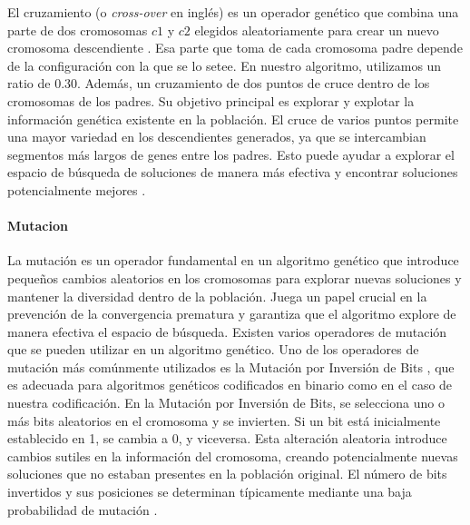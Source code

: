 El cruzamiento (o \emph{cross-over} en inglés) es un operador genético que
combina una parte de dos cromosomas $c1$ y $c2$ elegidos aleatoriamente para
crear un nuevo cromosoma descendiente . Esa parte que toma de cada cromosoma padre
depende de la configuración con la que se lo setee. En nuestro algoritmo,
utilizamos un ratio de 0.30. Además, un cruzamiento de dos puntos  de cruce dentro de los cromosomas de los padres. Su objetivo principal es explorar y explotar la información genética existente en la población.
El cruce de varios puntos permite una mayor variedad en los descendientes
generados, ya que se intercambian segmentos más largos de genes entre los
padres. Esto puede ayudar a explorar el espacio de búsqueda de soluciones de
manera más efectiva y encontrar soluciones potencialmente mejores .

\paragraph{Mutacion}

La mutación es un operador fundamental en un algoritmo genético que introduce
pequeños cambios aleatorios en los cromosomas para explorar nuevas soluciones
 y mantener la diversidad dentro de la población. Juega un
papel crucial en la prevención de la convergencia prematura 
y garantiza que el algoritmo explore de manera efectiva el espacio de búsqueda.
Existen varios operadores de mutación que se pueden utilizar en un algoritmo
genético. Uno de los operadores de mutación más comúnmente utilizados es la
Mutación por Inversión de Bits , que es adecuada para algoritmos genéticos codificados en binario como en el caso de nuestra codificación.
En la Mutación por Inversión de Bits, se selecciona uno o más bits aleatorios en
el cromosoma y se invierten. Si un bit está inicialmente establecido en 1, se
cambia a 0, y viceversa. Esta alteración aleatoria introduce cambios sutiles en
la información del cromosoma, creando potencialmente nuevas soluciones que no
estaban presentes en la población original. El número de bits invertidos y sus
posiciones se determinan típicamente mediante una baja probabilidad de mutación
.




